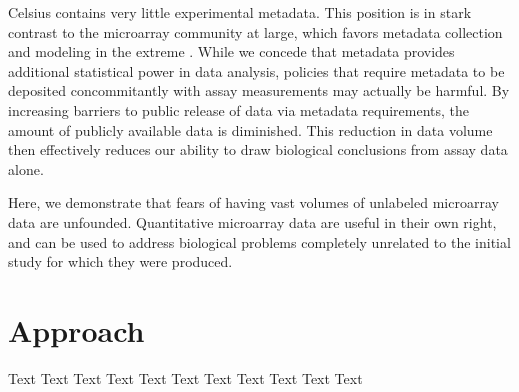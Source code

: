 \documentclass{bioinfo}
\begin{document}
Celsius contains very little experimental metadata.  This position is in stark
contrast to the microarray community at large, which favors metadata collection
and modeling in the extreme \cite{mo,mage,miame}.  While we concede that
metadata provides additional statistical power in data analysis, policies that
require metadata to be deposited concommitantly with assay measurements may
actually be harmful.  By increasing barriers to public release of data via
metadata requirements, the amount of publicly available data is diminished.
This reduction in data volume then effectively reduces our ability to draw
biological conclusions from assay data alone.

Here, we demonstrate that fears of having vast volumes of unlabeled microarray
data are unfounded.  Quantitative microarray data are useful in their own
right, and can be used to address biological problems completely unrelated to
the initial study for which they were produced.


\section{Approach}
Text Text Text  Text Text Text Text Text Text Text Text
\end{document}
